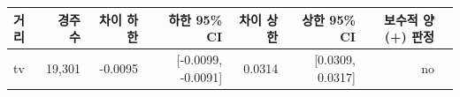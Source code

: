 \begin{tabular}{lrrrrrrl}
\toprule
거리 & 경주 수 & 차이 하한 & 하한 95\% CI & 차이 상한 & 상한 95\% CI & 보수적 양(+) 판정 \\
\midrule
tv & 19,301 & -0.0095 & [-0.0099, -0.0091] & 0.0314 & [0.0309, 0.0317] & no \\
\bottomrule
\end{tabular}

